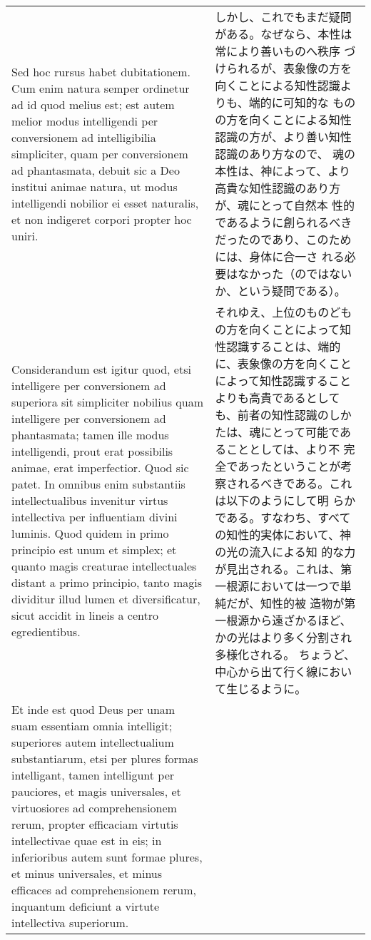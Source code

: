 \documentclass[10pt]{jsarticle} %
\begin{document}
\begin{longtable}{p{21em}p{21em}}
\\

Sed hoc rursus habet dubitationem. Cum enim natura semper ordinetur ad
id quod melius est; est autem melior modus intelligendi per
conversionem ad intelligibilia simpliciter, quam per conversionem ad
phantasmata, debuit sic a Deo institui animae natura, ut modus
intelligendi nobilior ei esset naturalis, et non indigeret corpori
propter hoc uniri.

&

しかし、これでもまだ疑問がある。なぜなら、本性は常により善いものへ秩序
づけられるが、表象像の方を向くことによる知性認識よりも、端的に可知的な
ものの方を向くことによる知性認識の方が、より善い知性認識のあり方なので、
魂の本性は、神によって、より高貴な知性認識のあり方が、魂にとって自然本
性的であるように創られるべきだったのであり、このためには、身体に合一さ
れる必要はなかった（のではないか、という疑問である）。


\\


Considerandum est igitur quod, etsi intelligere per conversionem ad
superiora sit simpliciter nobilius quam intelligere per conversionem
ad phantasmata; tamen ille modus intelligendi, prout erat possibilis
animae, erat imperfectior. Quod sic patet. In omnibus enim substantiis
intellectualibus invenitur virtus intellectiva per influentiam divini
luminis. Quod quidem in primo principio est unum et simplex; et quanto
magis creaturae intellectuales distant a primo principio, tanto magis
dividitur illud lumen et diversificatur, sicut accidit in lineis a
centro egredientibus.

&

それゆえ、上位のものどもの方を向くことによって知性認識することは、端的
に、表象像の方を向くことによって知性認識することよりも高貴であるとして
も、前者の知性認識のしかたは、魂にとって可能であることとしては、より不
完全であったということが考察されるべきである。これは以下のようにして明
らかである。すなわち、すべての知性的実体において、神の光の流入による知
的な力が見出される。これは、第一根源においては一つで単純だが、知性的被
造物が第一根源から遠ざかるほど、かの光はより多く分割され多様化される。
ちょうど、中心から出て行く線において生じるように。


\\



Et inde est quod Deus per unam suam essentiam omnia intelligit;
superiores autem intellectualium substantiarum, etsi per plures formas
intelligant, tamen intelligunt per pauciores, et magis universales, et
virtuosiores ad comprehensionem rerum, propter efficaciam virtutis
intellectivae quae est in eis; in inferioribus autem sunt formae
plures, et minus universales, et minus efficaces ad comprehensionem
rerum, inquantum deficiunt a virtute intellectiva superiorum.



\end{longtable}
\end{document}
